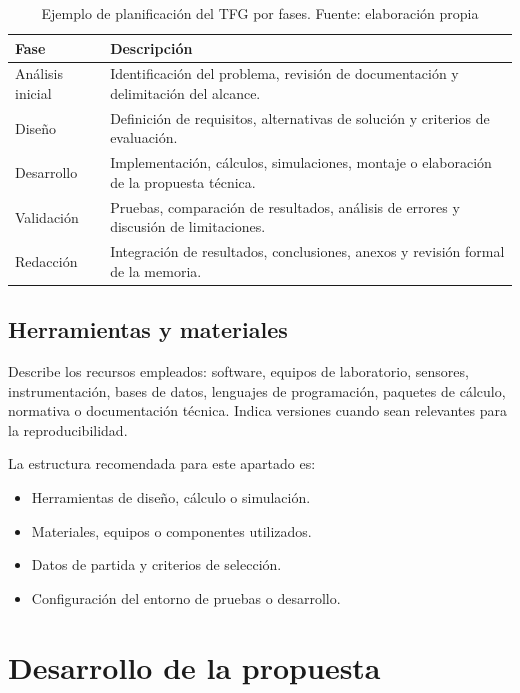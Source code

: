 \begin{table}[!ht]
    \footnotesize
    \centering
    \caption[Ejemplo de planificación del TFG por fases]{Ejemplo de planificación del TFG por fases. Fuente: elaboración propia}
    \label{tab:plan-trabajo}
    \begin{tabularx}{\textwidth}{p{3.4cm}X}
        \toprule
        \textbf{Fase} & \textbf{Descripción} \\
        \midrule
        Análisis inicial & Identificación del problema, revisión de documentación y delimitación del alcance. \\
        Diseño & Definición de requisitos, alternativas de solución y criterios de evaluación. \\
        Desarrollo & Implementación, cálculos, simulaciones, montaje o elaboración de la propuesta técnica. \\
        Validación & Pruebas, comparación de resultados, análisis de errores y discusión de limitaciones. \\
        Redacción & Integración de resultados, conclusiones, anexos y revisión formal de la memoria. \\
        \bottomrule
    \end{tabularx}
\end{table}

\subsection{Herramientas y materiales}
\label{subsec:herramientas-materiales}

Describe los recursos empleados: software, equipos de laboratorio, sensores,
instrumentación, bases de datos, lenguajes de programación, paquetes de cálculo,
normativa o documentación técnica. Indica versiones cuando sean relevantes para
la reproducibilidad.

La estructura recomendada para este apartado es:

\begin{itemize}
    \item Herramientas de diseño, cálculo o simulación.
    \item Materiales, equipos o componentes utilizados.
    \item Datos de partida y criterios de selección.
    \item Configuración del entorno de pruebas o desarrollo.
\end{itemize}

\section{Desarrollo de la propuesta}
\label{sec:desarrollo-propuesta}

